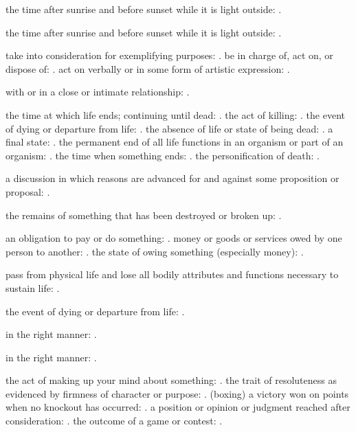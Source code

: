   the time after sunrise and before sunset while it is light outside: .

  the time after sunrise and before sunset while it is light outside: .

  take into consideration for exemplifying purposes: . be in charge of, act on, or dispose of: . act on verbally or in some form of artistic expression: .

  with or in a close or intimate relationship: .

  the time at which life ends; continuing until dead: . the act of killing: . the event of dying or departure from life: . the absence of life or state of being dead: . a final state: . the permanent end of all life functions in an organism or part of an organism: . the time when something ends: . the personification of death: .

  a discussion in which reasons are advanced for and against some proposition or proposal: .

  the remains of something that has been destroyed or broken up: .

  an obligation to pay or do something: . money or goods or services owed by one person to another: . the state of owing something (especially money): .

  pass from physical life and lose all bodily attributes and functions necessary to sustain life: .

  the event of dying or departure from life: .

  in the right manner: .

  in the right manner: .

  the act of making up your mind about something: . the trait of resoluteness as evidenced by firmness of character or purpose: . (boxing) a victory won on points when no knockout has occurred: . a position or opinion or judgment reached after consideration: . the outcome of a game or contest: .

